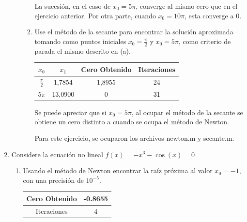 \documentclass{udpreport}
\begin{document}
\begin{enumerate}
\begin{enumerate}
\begin{enumerate}
        La sucesión, en el caso de $x_{0}=5\pi$, converge al mismo cero que en el ejercicio anterior. Por otra parte, cuando $x_{0}=10\pi$, esta converge a 0.
        
        	\item Use el método de la secante para encontrar la solución aproximada tomando como puntos iniciales $x_{0}=\frac{\pi}{2}$ y $x_{0}=5\pi$, como criterio de parada el mismo descrito en (a).
        	\begin{table} [H]
        			\centering
        			\begin{tabular}{|c|c|c|c|}
        				\hline
        				$x_{0}$& $x_{1}$ & Cero Obtenido & Iteraciones\\
        				\hline
        				$\frac{\pi}{2}$ & 1,7854 & 1,8955 & 24 \\
        				\hline 
        				$5\pi$& 13,0900 & 0 & 31\\
        				\hline
        			\end{tabular}
        		\end{table}
        		
        Se puede apreciar que si $x_{0}=5\pi$, al ocupar el método de la secante se obtiene un cero distinto a cuando se ocupa el método de Newton.	
        
        
        Para este ejercicio, se ocuparon los archivos newton.m y secante.m.
        \end{enumerate}
        
    \end{enumerate}
		

\item Considere la ecuación no lineal $f(x) = -x^{3} - \cos(x) = 0$
    \begin{enumerate}
    
        \item Usando el método de Newton encontrar la raíz próxima al valor $x_{0}=-1$, con una precisión de $10^{-5}$.\\
        \begin{table}[H]
        \centering
        \begin{tabular} { |c|c|}
        
        \hline
        Cero Obtenido &  -0.8655\\
        \hline
        Iteraciones   &    4\\
        \hline
        
        \end{tabular}
        \end{table}
        

\end{enumerate}
\end{enumerate}
\end{document}
